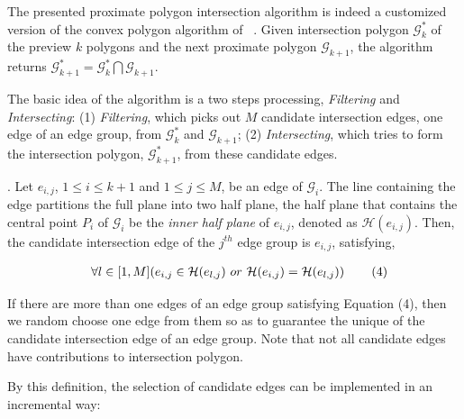 The presented proximate polygon intersection algorithm is indeed a customized version of the convex polygon algorithm of ~\cite{ORourke:Intersection}.
%
Given intersection polygon $\mathcal{G}^*_k$ of the preview $k$ polygons and the next proximate polygon $\mathcal{G}_{k+1}$, the algorithm returns $\mathcal{G}^*_{k+1} = \mathcal{G}^*_k  \bigcap \mathcal{G}_{k+1}$.

The basic idea of the algorithm is a two steps processing, \ie \emph{Filtering} and \emph{Intersecting}:
 (1) \emph{Filtering}, which picks out $M$ candidate intersection edges, one edge of an edge group, from $\mathcal{G}^*_k $ and $\mathcal{G}_{k+1}$;
 (2) \emph{Intersecting}, which tries to form the intersection polygon, \ie $\mathcal{G}^*_{k+1}$, from these candidate edges.



.
Let $e_{i,j}$, $1 \le i \le k+1$ and $1 \le j \le M$, be an edge of $\mathcal{G}_{i}$. The line containing the edge partitions the full plane into two half plane, the half plane that contains the central point $P_i$ of $\mathcal{G}_i$ be the \emph{inner half plane} of $e_{i,j}$, denoted as $\mathcal{H}(e_{i,j})$.
%
Then, the candidate intersection edge of the $j^{th}$ edge group is $e_{i,j}$, satisfying,

\vspace{-2ex}
\begin{equation*}
\label{equ-inter-edge-full}
    \begin{aligned}
        \hspace{2ex}  \forall l \in [1, M] (e_{i,j} \in \mathcal{H}(e_{l,j}) ~or~ \mathcal{H}(e_{i,j}) = \mathcal{H}(e_{l,j}) )    \hspace{5ex} (4)\\
    \end{aligned}
\end{equation*}
\vspace{-2ex}


If there are more than one edges of an edge group satisfying Equation (4), then we random choose one edge from them so as to guarantee the unique of the candidate intersection edge of an edge group. Note that not all candidate edges have contributions to intersection polygon.


By this definition, the selection of candidate edges can be implemented in an incremental way:


